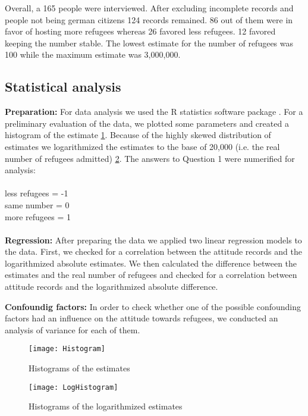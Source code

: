 \documentclass{article}
\begin{document}
Overall, a 165 people were interviewed. After excluding incomplete records and people not being german citizens 124 records remained. 86 out of them were in favor of hosting more refugees whereas 26 favored less refugees. 12 favored keeping the number stable. The lowest estimate for the number of refugees was 100 while the maximum estimate was 3,000,000.




\subsection{Statistical analysis}

\textbf{Preparation:} For data analysis we used the R statistics software package \citep{RCoreTeam2014}. For a preliminary evaluation of the data, we plotted some parameters and created a histogram of the estimate \ref{fig: Histogram1}. Because of the highly skewed distribution of estimates we logarithmized the estimates to the base of 20,000 (i.e. the real number of refugees admitted) \ref{fig: Histogram2}.
The answers to Question 1 were numerified for analysis: \\
\\
\indent\indent less refugees = -1\\
\indent\indent same number = 0\\
\indent\indent more refugees = 1\\
\\
\textbf{Regression:} After preparing the data we applied two linear regression models to the data. First, we checked for a correlation between the attitude records and the logarithmized absolute estimates. We then calculated the difference between the estimates and the real number of refugees and checked for a correlation between attitude records and the logarithmized absolute difference.


\noindent\textbf{Confoundig factors:} In order to check whether one of the possible confounding factors had an influence on the attitude towards refugees, we conducted an analysis of variance for each of them.



\begin{figure}[H]
	\centering 
	\texttt{[image: Histogram]}
	\caption{Histograms of the estimates}\label{fig: Histogram1}
\end{figure}

\begin{figure}[H]
	\centering 
	\texttt{[image: LogHistogram]}
	\caption{Histograms of the logarithmized estimates}\label{fig: Histogram2}
\end{figure}
\end{document}
